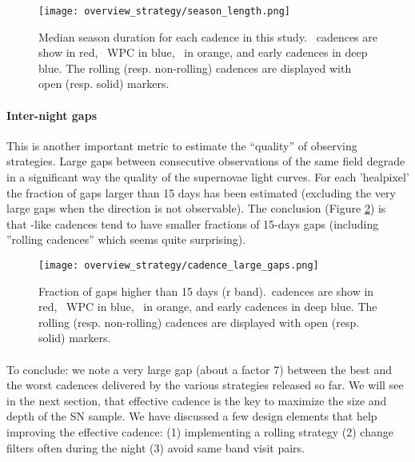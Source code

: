 \begin{figure}
  \begin{center}
    \texttt{[image: overview\_strategy/season\_length.png]}
    \caption{Median season duration for each cadence in this
      study. \altsched~cadences are show in red, \opsim~WPC in blue,
      \slair~in orange, and early cadences in deep blue. The rolling
      (resp. non-rolling) cadences are displayed with open
      (resp. solid) markers. }
    \label{fig:season_length}
  \end{center}
\end{figure}

\paragraph{Inter-night gaps}This is another important metric to estimate the ``quality'' of observing strategies. Large gaps between consecutive observations of the same field degrade in a significant way the quality of the supernovae light curves. For each 'healpixel' the fraction of gaps larger than 15 days has been estimated (excluding the very large gaps when the direction is not observable). The conclusion (Figure \ref{fig:large_gaps}) is that \altsched-like cadences tend to have smaller fractions of 15-days gaps (including ''rolling cadences'' which seems quite surprising).

\begin{figure}
  \begin{center}
    \texttt{[image: overview\_strategy/cadence\_large\_gaps.png]}
    \caption{Fraction of gaps higher than 15 days (r band).\altsched~cadences are show in red, \opsim~WPC in blue,
      \slair~in orange, and early cadences in deep blue. The rolling
      (resp. non-rolling) cadences are displayed with open
      (resp. solid) markers. }
    \label{fig:large_gaps}
  \end{center}
\end{figure}



\paragraph{} To conclude: we note a very large gap (about a factor 7) between
the best and the worst cadences delivered by the various strategies
released so far.  We will see in the next section, that effective
cadence is the key to maximize the size and depth of the SN sample.
We have discussed a few design elements that help improving the effective
cadence: (1) implementing a rolling strategy (2) change filters often
during the night (3) avoid same band visit pairs.

